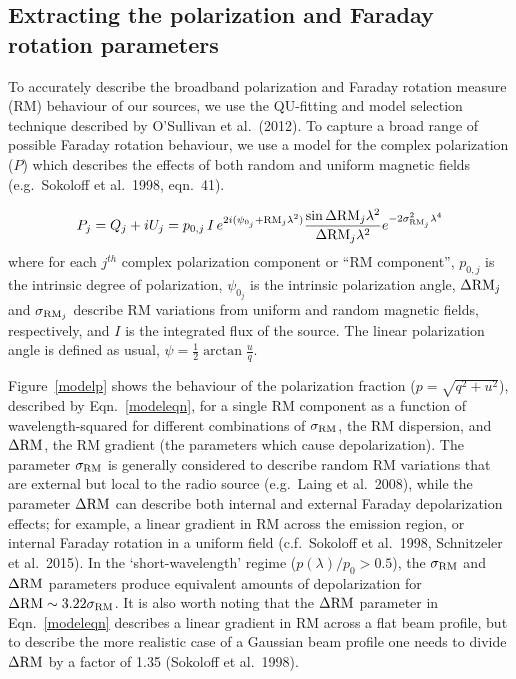 \documentclass{mnras}
\newcommand*\sigmaRM{\sigma_{\rm RM}}
\newcommand*\DeltaRM{\Delta{\rm RM}}
\begin{document}
\subsection{Extracting the polarization and Faraday rotation parameters} \label{model}

To accurately describe the broadband polarization and Faraday rotation measure (RM) behaviour of our sources, we use the QU-fitting and model selection technique described by O'Sullivan et al.~(2012). To capture a broad range of possible Faraday rotation behaviour, we use a model for the complex polarization ($P$) which describes the effects of both random and uniform magnetic fields (e.g.~Sokoloff et al.~1998, eqn.~41). 

\begin{equation}
P_j = Q_j + iU_j = p_{0,j} \, I\, e^{2 i (\psi_{0_j}+{\rm RM}_j \lambda^2)}  \frac{\sin \Delta {\rm RM}_j \lambda^2}{\Delta {\rm RM}_j \lambda^2} e^{-2\sigma^2_{{\rm RM}_j} \lambda^4}
\label{modeleqn}
\end{equation}
where for each $j^{th}$ complex polarization component or ``RM component'', $p_{0,j}$ is the intrinsic degree of polarization, $\psi_{0_j}$ is the intrinsic polarization angle, $\Delta {\rm RM}_j$ and $\sigma_{{\rm RM}_j}$ describe RM variations from uniform and random magnetic fields, respectively, and $I$ is the integrated flux of the source. The linear polarization angle is defined as usual, $\psi=\frac{1}{2} \arctan \frac{u}{q}$. 

Figure~\ref{modelp} shows the behaviour of the polarization fraction ($p=\sqrt{q^2+u^2}$), described by Eqn.~\ref{modeleqn}, for a single RM component as a function of wavelength-squared for different combinations of $\sigma_{\rm RM}$, the RM dispersion, and $\Delta{\rm RM}$, the RM gradient (the parameters which cause depolarization). 
The parameter $\sigma_{\rm RM}$ is generally considered to describe random RM variations that are external but local to the radio source (e.g.~Laing et al.~2008), while the parameter $\Delta{\rm RM}$ can describe both internal and external Faraday depolarization effects; for example, a linear gradient in RM across the emission region, or internal Faraday rotation in a uniform field (c.f.~Sokoloff et al.~1998, Schnitzeler et al.~2015).  
In the `short-wavelength' regime ($p(\lambda)/p_0>0.5$), the $\sigmaRM$ and $\DeltaRM$ parameters produce equivalent amounts of depolarization for $\DeltaRM\sim3.22\sigmaRM$. It is also worth noting that the $\DeltaRM$ parameter in Eqn.~\ref{modeleqn} describes a linear gradient in RM across a flat beam profile, but to describe the more realistic case of a Gaussian beam profile one needs to divide $\DeltaRM$ by a factor of 1.35 (Sokoloff et al.~1998).
\end{document}
